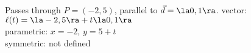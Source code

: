 {Passes through $P=(-2,5)$, parallel to $\vec d = \la 0,1\ra$.
}
{vector: $\ell(t) = \la-2,5\ra + t\la 0,1\ra$\\
parametric: $x= -2$, $y=5+t$\\
symmetric: not defined
}

